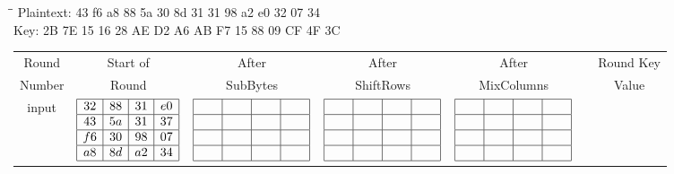\begin{tabbing}
  \hspace*{3cm}\=\hspace*{3cm}\= \kill
  Plaintext:  43 f6 a8 88 5a 30 8d 31 31 98 a2 e0 32 07 34 \\
  Key: \> 2B 7E 15 16 28 AE D2 A6 AB F7 15 88 09 CF 4F 3C \\
\end{tabbing}

\begin{longtable}{c c c c c c c}
  Round  & Start of & After & After & After &  & Round Key \\
  Number & Round & SubBytes & ShiftRows & MixColumns & & Value \\

  input & 
  $\begin{array}{|c|c|c|c|}
    \hline
    32 & 88 & 31 & e0 \\ \hline
    43 & 5a & 31 & 37 \\ \hline
    f6 & 30 & 98 & 07 \\ \hline
    a8 & 8d & a2 & 34 \\ \hline
  \end{array}$ &
  $\begin{array}{|c|c|c|c|}
    \hline
        {\ }{\ }{\ }{\ } & {\ }{\ }{\ }{\ } & {\ }{\ }{\ }{\ } & 
        {\ }{\ }{\ }{\ } \\ \hline
        &  &  &  \\ \hline
        &  &  &  \\ \hline
        &  &  &  \\ \hline
  \end{array}$ &
  $\begin{array}{|c|c|c|c|}
    \hline
        {\ }{\ }{\ }{\ } & {\ }{\ }{\ }{\ } & {\ }{\ }{\ }{\ } & 
        {\ }{\ }{\ }{\ } \\ \hline
        &  &  &  \\ \hline
        &  &  &  \\ \hline
        &  &  &  \\ \hline
  \end{array}$ &
  $\begin{array}{|c|c|c|c|}
    \hline
        {\ }{\ }{\ }{\ } & {\ }{\ }{\ }{\ } & {\ }{\ }{\ }{\ } & 
        {\ }{\ }{\ }{\ } \\ \hline
        &  &  &  \\ \hline
        &  &  &  \\ \hline
        &  &  &  \\ \hline
  \end{array}$ &


\end{longtable}
